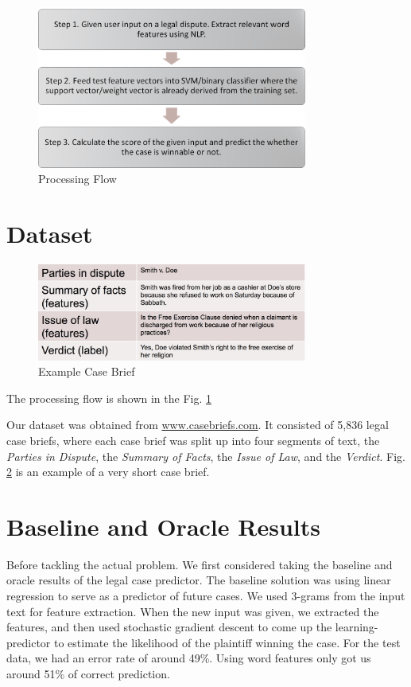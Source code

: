 \documentclass[journal]{IEEEtran}
\begin{document}
\begin{figure}
    \centering
    \includegraphics[width=3.5in]{flow.png}
    \caption{Processing Flow}
    \label{fig:ProcessingFlow}
\end{figure}

\section{Dataset}

\begin{figure}
    \centering
    \includegraphics[width=3.5in]{exampleCaseBrief.jpg}
    \caption{Example Case Brief}
    \label{fig:ExampleCaseBrief}
\end{figure}

The processing flow is shown in the Fig. \ref{fig:ProcessingFlow}

Our dataset was obtained from \url{www.casebriefs.com}. It consisted of 5,836 legal case briefs, where each case brief was split up into four segments of text, the \textit{Parties in Dispute}, the \textit{Summary of Facts}, the \textit{Issue of Law}, and the \textit{Verdict}. Fig. \ref{fig:ExampleCaseBrief} is  an example of a very short case brief.

\section{Baseline and Oracle Results}
Before tackling the actual problem. We first considered taking the baseline and oracle results of the legal case predictor. The baseline solution was using linear regression to serve as a predictor of future cases. We used 3-grams from the input text for feature extraction.  When the new input was given, we extracted the features, and then used stochastic gradient descent to come up the learning-predictor to estimate the likelihood of the plaintiff winning the case. For the test data, we had an error rate of around 49\%. Using word features only got us around 51\% of correct prediction.
\end{document}
